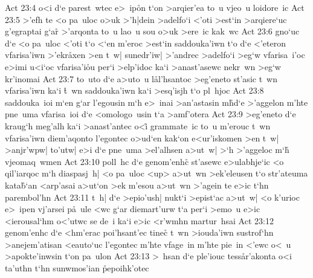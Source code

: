 \vs Act 23:4
o<i
d`e
parest~wtec
e>~ip\r{o}n
t`on
>arqier'ea
to~u
vjeo~u
loidore~ic\bibvsend
\vs Act 23:5
>'efh
te
<o
pa~uloc
o>uk
>'h|dein
>adelfo`i
<'oti
>est`in
>arqiere`uc
g'egraptai
g`a\r{r}
>'arqonta
to~u
lao~u
sou
o>uk
>ere~ic
kak~wc\bibvsend
\vs Act 23:6
gno`uc
d`e
<o
pa~uloc
<'oti
t`o
<`en
m'eroc
>est`in
saddouka'iwn
t`o
d`e
<'eteron
vfarisa'iwn
>'ekr\r{a}xen
>en
t~w|
sunedr'iw|
>'andrec
>adelfo`i
>eg`w
vfarisa~i'oc
e>imi
u<i`oc
vfarisa'i\r{o}u
per`i
>elp'idoc
ka`i
>anast'asewc
nekr~wn
>eg`w
kr'inomai\bibvsend
\vs Act 23:7
to~uto
d`e
a>uto~u
l\r{a}l'hsantoc
>eg'eneto
st'asic
t~wn
vfarisa'iwn
ka`i
\r{t}~wn
saddouka'iwn
ka`i
>esq'isjh
t`o
pl~hjoc\bibvsend
\vs Act 23:8
saddouka~ioi
m`en
g`ar
l'egousin
m`h
e>~inai
>an'astasin
m\r{h}d`e
>'aggelon
m'hte
pne~uma
vfarisa~ioi
d`e
<omologo~usin
t`a
>amf'otera\bibvsend
\vs Act 23:9
>eg'eneto
d`e
kraug`h
meg'alh
ka`i
>anast'antec
o<i\r{}
grammate~ic
to~u
m'erouc
t~wn
vfarisa'iwn
diem'aqonto
l'egontec
o>ud`en
kak`on
e<ur'iskomen
>en
t~w|
>anjr'wpw|
to'utw|
e>i
d`e
pne~uma
>el'alhsen
a>ut~w|
>`h
>'aggeloc
m`h\r{}
vjeomaq~wmen\bibvsend
\vs Act 23:10
poll~hc
d`e
genom'enhc\r{}
st'asewc
e>ulabhje`ic
<o
qil'iarqoc
m`h
diaspasj~h|
<o
pa~uloc
<up>
a>ut~wn
>ek'eleusen
t`o
str'ateuma
kata\r{b}`an
<arp'asai
a>ut`on
>ek
m'esou
a>ut~wn
>'agein
te
e>ic
t`hn
parembol'hn\bibvsend
\vs Act 23:11
t~h|
d`e
>epio'ush|
nukt`i
>epist`ac
a>ut~w|
<o
k'urioc
e>~ipen
vj'arsei
p\r{a}~ule
<wc
g`ar
diemart'urw
t`a
per`i
>emo~u
e>ic
<ierousal`hm
o<'utwc
se
de~i
ka`i
e>ic
<r'wmhn
martur~hsai\bibvsend
\vs Act 23:12
genom'enhc
d`e
<hm'erac
poi'hsant'ec
tinec\r{}
t~wn
>iouda'iwn
sustrof`hn
>anejem'atisan
<eauto`uc
l'egontec
m'hte
vfage~in
m'hte
pie~in
<'ewc
o<~u
>apokte'inwsin
t`on
pa~ulon\bibvsend
\vs Act 23:13
>~hsan
d`e
ple'iouc
tess\r{a}r'akonta
o<i
ta'uthn
t`hn
sunwmos'ian
\r{p}epoihk'otec\bibvsend
{}
